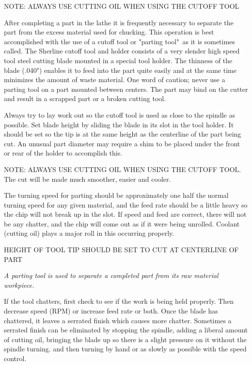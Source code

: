 \bigskip
NOTE: ALWAYS USE CUTTING OIL WHEN USING THE CUTOFF TOOL


After completing a part in the lathe it is frequently necessary to separate the
part from the excess material used for chucking. This operation is best
accomplished with the use of a cutoff tool or "parting tool"\ as it is sometimes
called. The Sherline cutoff tool and holder consists of a very slender high
speed tool steel cutting blade mounted in a special tool holder. The thinness of
the blade (.040") enables it to feed into the part quite easily and at the same
time minimizes the amount of waste material. One word of caution; never use a
parting tool on a part mounted between centers. The part may bind on the cutter
and result in a scrapped part or a broken cutting tool.


Always try to lay work out so the cutoff tool is used as close to the spindle as
possible. Set blade height by sliding the blade in its slot in the tool holder.
It should be set so the tip is at the same height as the centerline of the part
being cut. An unusual part diameter may require a shim to be placed under the
front or rear of the holder to accomplish this.

NOTE: ALWAYS USE CUTTING OIL WHEN USING THE CUTOFF TOOL. The cut will be made
much smoother, easier and cooler.

The turning speed for parting should be approximately one half the normal
turning speed for any given material, and the feed rate should be a little heavy
so the chip will not break up in the slot. If speed and feed are correct, there
will not be any chatter, and the chip will come out as if it were being
unrolled. Coolant (cutting oil) plays a major roll in this occurring properly.

\bigskip
HEIGHT OF TOOL TIP SHOULD BE SET TO CUT AT CENTERLINE OF PART
\bigskip

\textit{A parting tool is used to separate a completed part from its raw
material workpiece.}

\bigskip

If the tool chatters, first check to see if the work is being held properly.
Then decrease speed (RPM) or increase feed rate or both. Once the blade has
chattered, it leaves a serrated finish which causes more chatter. Sometimes a
serrated finish can be eliminated by stopping the spindle, adding a liberal
amount of cutting oil, bringing the blade up so there is a slight pressure on it
without the spindle turning. and then turning by hand or as slowly as possible
with the speed control.

